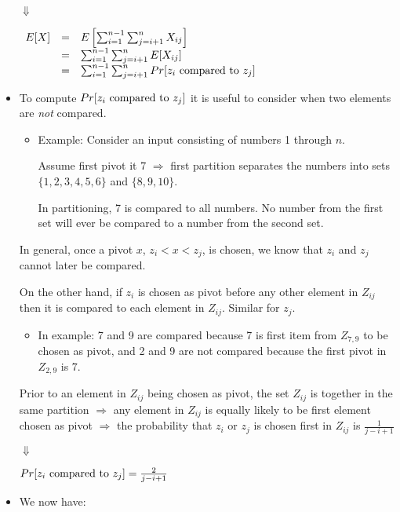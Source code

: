 \documentclass[11pt]{article}
\begin{document}
\begin{itemize}
  $\Downarrow$
  
  $\begin{array}{lcl}
    E[X] &=& E\left[\sum_{i=1}^{n-1}\sum_{j=i+1}^{n} X_{ij}\right] \\
    &=& \sum_{i=1}^{n-1}\sum_{j=i+1}^{n} E[X_{ij}] \\
    &=& \sum_{i=1}^{n-1}\sum_{j=i+1}^{n} Pr[z_i ~{\rm compared}~{\rm
	to}~ z_j]
  \end{array}$
  
\item To compute $Pr[z_i ~{\rm compared}~{\rm to}~ z_j]$ it is useful to
  consider when two elements are \emph{not} compared.
  
  \begin{itemize}
  \item[] Example: Consider an input consisting of numbers 1 through
    $n$.
    
    Assume first pivot it 7 $\Rightarrow$ first partition separates
    the numbers into sets $\{1,2,3,4,5,6\}$ and $\{8,9,10\}$.
    
    In partitioning, 7 is compared to all numbers. No number from the
    first set will ever be compared to a number from the second set.
  \end{itemize}
  
  In general, once a pivot $x$, $z_i<x<z_j$, is chosen, we know
  that $z_i$ and $z_j$ cannot later be compared.
  
  On the other hand, if $z_i$ is chosen as pivot before any other
  element in $Z_{ij}$ then it is compared to each element in
  $Z_{ij}$. Similar for $z_j$.
  
  \begin{itemize}
  \item[] In example: 7 and 9 are compared because 7 is first item from
    $Z_{7,9}$ to be chosen as pivot, and 2 and 9 are not compared because the
    first pivot in $Z_{2,9}$ is 7.
  \end{itemize}
  
  Prior to an element in $Z_{ij}$ being chosen as pivot, the set
  $Z_{ij}$ is together in the same partition $\Rightarrow$ any element
  in $Z_{ij}$ is equally likely to be first element chosen as pivot
  $\Rightarrow$ the probability that $z_i$ or $z_j$ is chosen first in
  $Z_{ij}$ is $\frac{1}{j-i+1}$

  $\Downarrow$

  $Pr[z_i ~{\rm compared}~{\rm to}~ z_j]=\frac{2}{j-i+1}$

  \item We now have:


\end{itemize}
\end{document}
